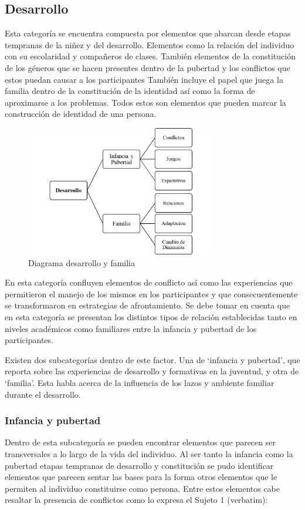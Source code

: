 \subsection{Desarrollo}
Esta categoría se encuentra compuesta por elementos que abarcan desde etapas
tempranas de la niñez y del desarrollo.
Elementos como la relación del individuo con su escolaridad y compañeros de
clases.
También elementos de la constitución de los géneros que se hacen presentes
dentro de la pubertad y los conflictos que estos puedan causar a los
participantes
También incluye el papel que juega la familia dentro de la constitución de la
identidad así como la forma de aproximarse a los problemas.
Todos estos son elementos que pueden marcar la construcción de identidad de una
persona.

\begin{figure}
    \centering
    \includegraphics[width=0.75\textwidth]{desarrollo}
    \caption{Diagrama desarrollo y familia}\label{fig:desarrollo}
\end{figure}

En esta categoría confluyen elementos de conflicto así como las experiencias que
permitieron el manejo de los mismos en los participantes y que
consecuentemente se transformaron en estrategias de afrontamiento. Se debe tomar
en cuenta que en esta categoría se presentan los distintos tipos de relación
establecidas tanto en niveles académicos como familiares entre la infancia y
pubertad de los participantes.

Existen dos subcategorías dentro de este factor. Una de ‘infancia y pubertad’,
que reporta sobre las experiencias de desarrollo y formativas en la juventud, y
otra de ‘familia’. Esta habla acerca de la influencia de los lazos y ambiente
familiar durante el desarrollo.

\subsubsection{Infancia y pubertad}
Dentro de esta subcategoría se pueden
encontrar elementos que parecen ser transversales a lo largo de la vida del
individuo. Al ser tanto la infancia como la pubertad etapas tempranas de
desarrollo y constitución se pudo identificar elementos que parecen sentar las
bases para la forma otros elementos que le permiten al individuo constituirse
como persona. Entre estos elementos cabe resaltar la presencia de conflictos
como lo expresa el Sujeto 1 (verbatim):

